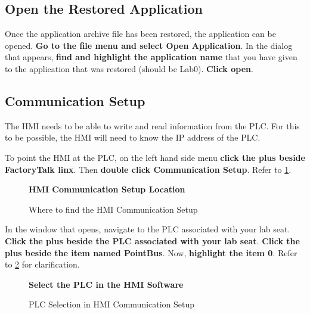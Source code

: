 \subsection{Open the Restored Application}

Once the application archive file has been restored, the application can be opened. \textbf{Go to the file menu and select Open Application}. In the dialog that appears, \textbf{find and highlight the application name} that you have given to the application that was restored (should be Lab0). \textbf{Click open}.

\subsection{Communication Setup}

The HMI needs to be able to write and read information from the PLC. For this to be possible, the HMI will need to know the IP address of the PLC. 

To point the HMI at the PLC, on the left hand side menu \textbf{click the plus beside FactoryTalk linx}. Then \textbf{double click Communication Setup}. Refer to \figureautorefname \ref{fig:HMICommunicationSetup}.

\begin{figure}[h]
\centering
\textbf{HMI Communication Setup Location}\par \medskip
{}
\caption{Where to find the HMI Communication Setup}
\label{fig:HMICommunicationSetup}
\end{figure}

In the window that opens, navigate to the PLC associated with your lab seat. \textbf{Click the plus beside the PLC associated with your lab seat}. \textbf{Click the plus beside the item named PointBus}. Now, \textbf{highlight the item 0}. Refer to \figureautorefname \ref{fig:PLCSelectionHMISetup} for clarification.


\begin{figure}[h]
\centering
\textbf{Select the PLC in the HMI Software}\par \medskip
{}
\caption{PLC Selection in HMI Communication Setup}
\label{fig:PLCSelectionHMISetup}
\end{figure}

